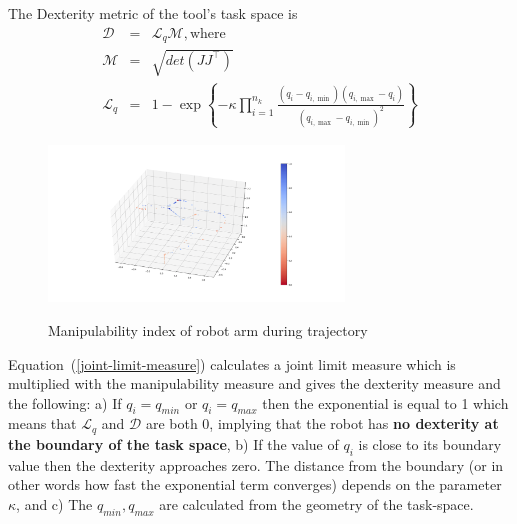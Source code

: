 The Dexterity metric of the tool's task space is
\begin{eqnarray}
\mathcal{D} &=& \mathcal{L}_q \mathcal{M}, \mbox{where}
\label{dexterity-measure}
\\
\mathcal{M} &=& \sqrt{det(J J^\top)}\\
\label{joint-limit-measure}
\mathcal{L}_{q}&=&1-\exp\left\{-\kappa\prod_{i=1}^{n_{k}}\frac{(q_{ {i}}-q_{i,\min})(q_{i,\max}-q_{i})}{(q_{i,\max}-q_{i,\min})^{2}}\right\}
\end{eqnarray}

\begin{center}
\begin{figure}[htbp]
\centering
\includegraphics[width=0.7\textwidth]{images/robot-planner1-manipulability-plot.png}\\
\caption{Manipulability index of robot arm during  trajectory}
\label{robot-planner1-manipulability-plot}
\end{figure}
\end{center}

Equation~(\ref{joint-limit-measure}) calculates a joint limit measure which is multiplied with the manipulability measure and gives the dexterity measure and the following:
a) If $q_i = q_{min}$ or $q_i = q_{max}$ then the exponential is equal to 1 which means that $\mathcal{L}_{q}$ and $\mathcal{D}$ are both 0, implying that the robot has \textbf{no dexterity at the boundary of the task space}, b) If the value of $q_i$ is close to its boundary value then the dexterity approaches zero. The distance from the boundary (or in other words how fast the exponential term converges) depends on the parameter $\kappa$, and c) The $q_{min}, q_{max}$ are calculated from the geometry of the task-space.

